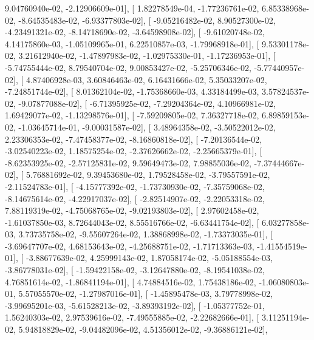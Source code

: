 \documentclass{article}
\begin{document}
          9.04760940e-02,  -2.12906609e-01],
       [  1.82278549e-04,  -1.77236761e-02,   6.85338968e-02,
         -8.64535483e-02,  -6.93377803e-02],
       [ -9.05216482e-02,   8.90527300e-02,  -4.23491321e-02,
         -8.14718690e-02,  -3.64598908e-02],
       [ -9.61020748e-02,   4.14175860e-03,  -1.05109965e-01,
          6.22510857e-03,  -1.79968918e-01],
       [  9.53301178e-02,   3.21612940e-02,  -1.47897983e-02,
         -1.02975330e-01,  -1.17236953e-01],
       [ -5.74755444e-02,   8.79540704e-02,   9.00853427e-02,
         -5.25706346e-02,  -5.77440957e-02],
       [  4.87406928e-03,   3.60846463e-02,   6.16431666e-02,
          5.35033207e-02,  -7.24851744e-02],
       [  8.01362104e-02,  -1.75368660e-03,   4.33184499e-03,
          3.57824537e-02,  -9.07877088e-02],
       [ -6.71395925e-02,  -7.29204364e-02,   4.10966981e-02,
          1.69429077e-02,  -1.13298576e-01],
       [ -7.59209805e-02,   7.36327718e-02,   6.89859153e-02,
         -1.03645714e-01,  -9.00031587e-02],
       [  3.48964358e-02,  -3.50522012e-02,   2.23306353e-02,
         -7.47458377e-02,  -8.16860818e-02],
       [ -7.20136544e-02,  -3.02540223e-02,   1.18575254e-02,
         -2.37626662e-02,  -2.25665379e-01],
       [ -8.62353925e-02,  -2.57125831e-02,   9.59649473e-02,
          7.98855036e-02,  -7.37444667e-02],
       [  5.76881692e-02,   9.39453680e-02,   1.79528458e-02,
         -3.79557591e-02,  -2.11524783e-01],
       [ -4.15777392e-02,  -1.73730930e-02,  -7.35759068e-02,
         -8.14675614e-02,  -4.22917037e-02],
       [ -2.82514907e-02,  -2.22053318e-02,   7.88119319e-02,
         -4.75068765e-02,  -9.02193803e-02],
       [  2.97602458e-02,  -1.61037850e-03,   8.72644043e-02,
          8.55516766e-02,  -6.63441754e-02],
       [  6.03277858e-03,   3.73735758e-02,  -9.55607264e-02,
          1.38868998e-02,  -1.73373035e-01],
       [ -3.69647707e-02,   4.68153643e-02,  -4.25688751e-02,
         -1.71713363e-03,  -1.41554519e-01],
       [ -3.88677639e-02,   4.25999143e-02,   1.87058174e-02,
         -5.05188554e-03,  -3.86778031e-02],
       [ -1.59422158e-02,  -3.12647880e-02,  -8.19541038e-02,
          4.76851614e-02,  -1.86841194e-01],
       [  4.74884516e-02,   1.75438186e-02,  -1.06080803e-01,
          5.57055570e-02,  -1.27987016e-01],
       [ -1.45895478e-03,   3.79778998e-02,  -3.99695201e-03,
         -5.61528213e-02,  -3.89393192e-02],
       [ -1.05377752e-01,   1.56240303e-02,   2.97539616e-02,
         -7.49555885e-02,  -2.22682666e-01],
       [  3.11251194e-02,   5.94818829e-02,  -9.04482096e-02,
          4.51356012e-02,  -9.36886121e-02],
\end{document}
